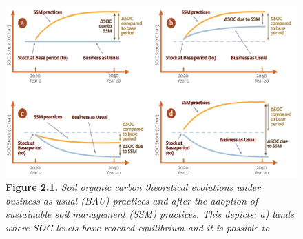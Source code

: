 \documentclass[
  10pt,
  b5paper,
]{book}
\begin{document}
\begin{figure}
\centering
\includegraphics{images/Figure_2.1.png}
\caption{\textbf{Figure 2.1.} \emph{Soil organic carbon theoretical evolutions under business-as-usual (BAU) practices and after the adoption of sustainable soil management (SSM) practices. This depicts: a) lands where SOC levels have reached equilibrium and it is possible to}}
\end{figure}
\end{document}
